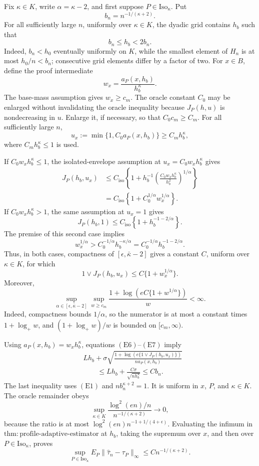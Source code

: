 Fix \(\kappa\in K\), write \(\alpha=\kappa-2\), and first suppose
\(P\in\mathrm{Iso}_\kappa\).  Put
\[
 b_n=n^{-1/(\kappa+2)}.
\]
For all sufficiently large \(n\), uniformly over \(\kappa\in K\), the dyadic grid contains \(h_b\) such that
\[
 b_n\leq h_b<2b_n.
 \tag{E1}
\]
Indeed, \(b_n<h_0\) eventually uniformly on \(K\), while the smallest element of \(H_n\) is at most \(h_0/n<b_n\); consecutive grid elements differ by a factor of two.  For \(x\in B\), define the proof intermediate
\[
 w_x=\frac{a_P(x,h_b)}{h_b^\kappa}.
\]
The base-mass assumption gives \(w_x\geq c_m\).  The oracle constant \(C_0\) may be enlarged without invalidating the oracle inequality because
\(J_P(h,u)\) is nondecreasing in \(u\).  Enlarge it, if necessary, so that
\(C_0c_m\geq C_m\).  For all sufficiently large \(n\),
\[
 u_x:=\min\{1,C_0a_P(x,h_b)\}
 \geq C_mh_b^\kappa,
 \tag{E2}
\]
where \(C_mh_b^\kappa\leq1\) is used.

If \(C_0w_xh_b^\kappa\leq1\), the isolated-envelope assumption at
\(u_x=C_0w_xh_b^\kappa\) gives
\[
\begin{aligned}
 J_P(h_b,u_x)
 &\leq C_{\mathrm{iso}}\left\{1+h_b^{-1}
 \left(\frac{C_0w_xh_b^\kappa}{h_b^2}\right)^{1/\alpha}\right\}\\
 &=C_{\mathrm{iso}}\left\{1+C_0^{1/\alpha}w_x^{1/\alpha}\right\}.
\end{aligned}
 \tag{E3}
\]
If \(C_0w_xh_b^\kappa>1\), the same assumption at \(u_x=1\) gives
\[
 J_P(h_b,1)
 \leq C_{\mathrm{iso}}\left\{1+h_b^{-1-2/\alpha}\right\}.
 \tag{E4}
\]
The premise of this second case implies
\[
 w_x^{1/\alpha}>C_0^{-1/\alpha}h_b^{-\kappa/\alpha}
 =C_0^{-1/\alpha}h_b^{-1-2/\alpha}.
 \tag{E5}
\]
Thus, in both cases, compactness of
\([\epsilon,\bar\kappa-2]\) gives a constant \(C\), uniform over
\(\kappa\in K\), for which
\[
 1\vee J_P(h_b,u_x)
 \leq C\{1+w_x^{1/\alpha}\}.
 \tag{E6}
\]
Moreover,
\[
 \sup_{\alpha\in[\epsilon,\bar\kappa-2]}
 \sup_{w\geq c_m}
 \frac{1+\log\!\left(eC\{1+w^{1/\alpha}\}\right)}{w}<\infty.
 \tag{E7}
\]
Indeed, compactness bounds \(1/\alpha\), so the numerator is at most a constant times \(1+\log_+w\), and
\((1+\log_+w)/w\) is bounded on \([c_m,\infty)\).

Using \(a_P(x,h_b)=w_xh_b^\kappa\), equations
\((\mathrm{E6})\)--\((\mathrm{E7})\) imply
\[
\begin{aligned}
 &Lh_b+\sigma\sqrt{
 \frac{1+\log\!\left(e\{1\vee J_P(h_b,u_x)\}\right)}
 {n a_P(x,h_b)}}\\
 &\qquad\leq Lh_b+\frac{C\sigma}{\sqrt{nh_b^\kappa}}
 \leq Cb_n.
\end{aligned}
 \tag{E8}
\]
The last inequality uses \((\mathrm{E1})\) and
\(nb_n^{\kappa+2}=1\).  It is uniform in \(x\), \(P\), and
\(\kappa\in K\).  The oracle remainder obeys
\[
 \sup_{\kappa\in K}
 \frac{\log^2(en)/n}{n^{-1/(\kappa+2)}}\longrightarrow0,
 \tag{E9}
\]
because the ratio is at most
\(\log^2(en)n^{-1+1/(4+\epsilon)}\).  Evaluating the infimum in
\(\mathrm{thm{:}profile\text{-}adaptive\text{-}estimator}\) at \(h_b\), taking the supremum over \(x\), and then over
\(P\in\mathrm{Iso}_\kappa\), proves
\[
 \sup_{P\in\mathrm{Iso}_\kappa}
 E_P\|\widehat\tau_n-\tau_P\|_\infty
 \leq Cn^{-1/(\kappa+2)}.
 \tag{E10}
\]


